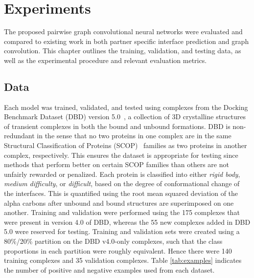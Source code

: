 \chapter{Experiments}
\label{chap:experiments}

The proposed pairwise graph convolutional neural networks were evaluated and compared to existing work in both partner specific interface prediction and graph convolution.
This chapter outlines the training, validation, and testing data, as well as the experimental procedure and relevant evaluation metrics.

\section{Data}

Each model was trained, validated, and tested using complexes from the Docking Benchmark Dataset (DBD) version 5.0~\cite{vreven2015}, a collection of 3D crystalline structures of transient complexes in both the bound and unbound formations. 
DBD is non-redundant in the sense that no two proteins in one complex are in the same Structural Classification of Proteins (SCOP)~\cite{murzin1995} families as two proteins in another complex, respectively.
This ensures the dataset is appropriate for testing since methods that perform better on certain SCOP families than others are not unfairly rewarded or penalized.
Each protein is classified into either \emph{rigid body}, \emph{medium difficulty}, or \emph{difficult}, based on the degree of conformational change of the interfaces.
This is quantified using the root mean squared deviation of the alpha carbons after unbound and bound structures are superimposed on one another. 
Training and validation were performed using the 175 complexes that were present in version 4.0 of DBD, whereas the 55 new complexes added in DBD 5.0 were reserved for testing. 
Training and validation sets were created using a 80\%/20\% partition on the DBD v4.0-only complexes, such that the class proportions in each partition were roughly equivalent.
Hence there were 140 training complexes and 35 validation complexes.
Table \ref{tab:examples} indicates the number of positive and negative examples used from each dataset.

